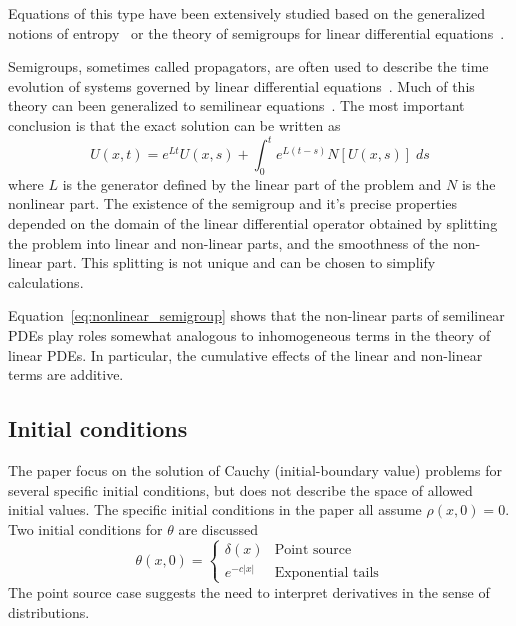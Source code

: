 \documentclass[12pt]{amsart}
\begin{document}
Equations of this type have been extensively studied based on the
generalized notions of
entropy~\cite{Lax:1957,FriedrichsLax:1971,BoillatRuggeri:1997,Yong:2008}
or the theory of semigroups for linear differential
equations~\cite{Segal:1963,OharuTakahashi:1989,Miyadera:1992,CazenaveHaraux:1998,Bellini-MoranteMcBride:1998,KawashimaYong:2004,KobayashiMatsumotoTanaka:2007}.

Semigroups, sometimes called propagators, are often used to describe
the time evolution of systems governed by linear differential
equations~\cite{Pazy:1983,EngelNagel:2000}.  Much of this theory can
been generalized to semilinear
equations~\cite{Miyadera:1992,CazenaveHaraux:1998,Bellini-MoranteMcBride:1998}.
The most important conclusion is that the exact solution can be
written as
\begin{equation}
  U(x,t) = e^{Lt} U(x, s) + \int_{0}^{t} e^{L(t-s)}N\left[U(x, s)\right] \; ds
  \label{eq:nonlinear_semigroup}
\end{equation}
where $L$ is the generator defined by the linear part of the problem
and $N$ is the nonlinear part.  The existence of the semigroup and
it's precise properties depended on the domain of the linear
differential operator obtained by splitting the problem into linear
and non-linear parts, and the smoothness of the non-linear part.  This
splitting is not unique and can be chosen to simplify calculations.

Equation~\ref{eq:nonlinear_semigroup} shows that the non-linear parts
of semilinear PDEs play roles somewhat analogous to inhomogeneous
terms in the theory of linear PDEs.  In particular, the cumulative
effects of the linear and non-linear terms are additive.  

\subsection{Initial conditions}

The paper focus on the solution of Cauchy (initial-boundary value)
problems for several specific initial conditions, but does not
describe the space of allowed initial values.  The specific initial
conditions in the paper all assume $\rho(x, 0) = 0$.  Two initial
conditions for $\theta$ are discussed
\begin{equation}
  \theta(x, 0) =
  \begin{cases}
    \delta(x) & \text{Point source} \\
    e^{-c\left|x\right|} & \text{Exponential tails}
  \end{cases}
\end{equation}
The point source case suggests the need to interpret derivatives in
the sense of distributions.
\end{document}
